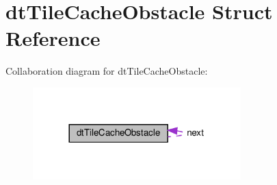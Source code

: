 \hypertarget{structdtTileCacheObstacle}{}\section{dt\+Tile\+Cache\+Obstacle Struct Reference}
\label{structdtTileCacheObstacle}


Collaboration diagram for dt\+Tile\+Cache\+Obstacle\+:
\nopagebreak
\begin{figure}[H]
\begin{center}
\leavevmode
\includegraphics[width=228pt]{structdtTileCacheObstacle__coll__graph}
\end{center}
\end{figure}
